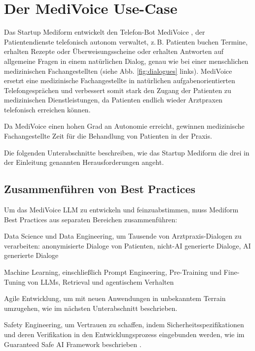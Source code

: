 \documentclass[twocolumn]{article}
\begin{document}
\begin{compactenum}
\end{compactenum}

\section{Der MediVoice Use-Case}
Das Startup Mediform entwickelt den Telefon-Bot MediVoice \cite{MediVoice}, der Patientendienste telefonisch autonom verwaltet, z.\,B. Patienten buchen Termine, erhalten Rezepte oder Überweisungsscheine oder erhalten Antworten auf allgemeine Fragen in einem natürlichen Dialog, genau wie bei einer menschlichen medizinischen Fachangestellten (siehe Abb. \ref{fig:dialogues} links). MediVoice ersetzt eine medizinische Fachangestellte in natürlichen aufgabenorientierten Telefongesprächen  \cite{Hosseini20} und verbessert somit stark den Zugang der Patienten zu medizinischen Dienstleistungen, da Patienten endlich wieder Arztpraxen telefonisch erreichen können.

Da MediVoice einen hohen Grad an Autonomie erreicht, gewinnen medizinische Fachangestellte Zeit für die Behandlung von Patienten in der Praxis.

Die folgenden Unterabschnitte beschreiben, wie das Startup Mediform die drei in der Einleitung genannten Herausforderungen angeht.

\subsection{Zusammenführen von Best Practices}

Um das MediVoice LLM zu entwickeln und feinzuabstimmen, muss Mediform Best Practices aus separaten Bereichen zusammenführen:
\begin{compactitem}
\item Data Science und Data Engineering, um Tausende von Arztpraxis-Dialogen zu verarbeiten: anonymisierte Dialoge von Patienten, nicht-AI generierte Dialoge, AI generierte Dialoge
\item Machine Learning, einschließlich Prompt Engineering, Pre-Training und Fine-Tuning von LLMs, Retrieval und agentischem Verhalten
\item Agile Entwicklung, um mit neuen Anwendungen in unbekanntem Terrain umzugehen, wie im nächsten Unterabschnitt beschrieben.
\item Safety Engineering, um Vertrauen zu schaffen, indem Sicherheitsspezifikationen und deren Verifikation in den Entwicklungsprozess eingebunden werden, wie im Guaranteed Safe AI Framework beschrieben \cite{Dalrymple24}.
\end{compactitem}
\end{document}
